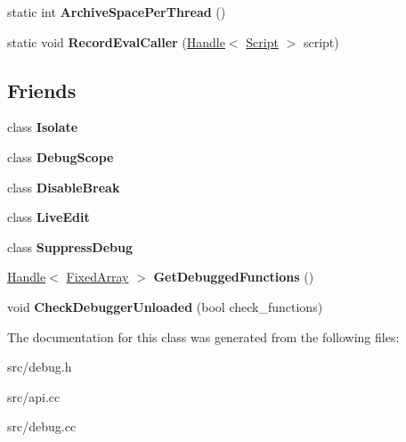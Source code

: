 \begin{DoxyCompactItemize}
\item 
\hypertarget{classv8_1_1internal_1_1_debug_adb09bdbce4e9edfc915eef0b59574825}{}static int {\bfseries Archive\+Space\+Per\+Thread} ()\label{classv8_1_1internal_1_1_debug_adb09bdbce4e9edfc915eef0b59574825}

\item 
\hypertarget{classv8_1_1internal_1_1_debug_a3b38134f1850b59f3d0f169ea96bbd47}{}static void {\bfseries Record\+Eval\+Caller} (\hyperlink{classv8_1_1internal_1_1_handle}{Handle}$<$ \hyperlink{classv8_1_1internal_1_1_script}{Script} $>$ script)\label{classv8_1_1internal_1_1_debug_a3b38134f1850b59f3d0f169ea96bbd47}

\end{DoxyCompactItemize}
\subsection*{Friends}
\begin{DoxyCompactItemize}
\item 
\hypertarget{classv8_1_1internal_1_1_debug_aba4f0964bdacf2bbf62cf876e5d28d0a}{}class {\bfseries Isolate}\label{classv8_1_1internal_1_1_debug_aba4f0964bdacf2bbf62cf876e5d28d0a}

\item 
\hypertarget{classv8_1_1internal_1_1_debug_a6cfbb0b64c1cf8e4443dc7e5900d8391}{}class {\bfseries Debug\+Scope}\label{classv8_1_1internal_1_1_debug_a6cfbb0b64c1cf8e4443dc7e5900d8391}

\item 
\hypertarget{classv8_1_1internal_1_1_debug_ab05c0a5dd1563dece5579c13b74f5011}{}class {\bfseries Disable\+Break}\label{classv8_1_1internal_1_1_debug_ab05c0a5dd1563dece5579c13b74f5011}

\item 
\hypertarget{classv8_1_1internal_1_1_debug_a8ec7b8802068537635d90721ff6dc475}{}class {\bfseries Live\+Edit}\label{classv8_1_1internal_1_1_debug_a8ec7b8802068537635d90721ff6dc475}

\item 
\hypertarget{classv8_1_1internal_1_1_debug_a63087cbd2f6e778d5ceeb41df0a0bdc7}{}class {\bfseries Suppress\+Debug}\label{classv8_1_1internal_1_1_debug_a63087cbd2f6e778d5ceeb41df0a0bdc7}

\item 
\hypertarget{classv8_1_1internal_1_1_debug_a478527a61be7002487ff08de6f4294c9}{}\hyperlink{classv8_1_1internal_1_1_handle}{Handle}$<$ \hyperlink{classv8_1_1internal_1_1_fixed_array}{Fixed\+Array} $>$ {\bfseries Get\+Debugged\+Functions} ()\label{classv8_1_1internal_1_1_debug_a478527a61be7002487ff08de6f4294c9}

\item 
\hypertarget{classv8_1_1internal_1_1_debug_a888c57a1d2bd5a7cc369bd47d97b0d45}{}void {\bfseries Check\+Debugger\+Unloaded} (bool check\+\_\+functions)\label{classv8_1_1internal_1_1_debug_a888c57a1d2bd5a7cc369bd47d97b0d45}

\end{DoxyCompactItemize}


The documentation for this class was generated from the following files\+:\begin{DoxyCompactItemize}
\item 
src/debug.\+h\item 
src/api.\+cc\item 
src/debug.\+cc\end{DoxyCompactItemize}
